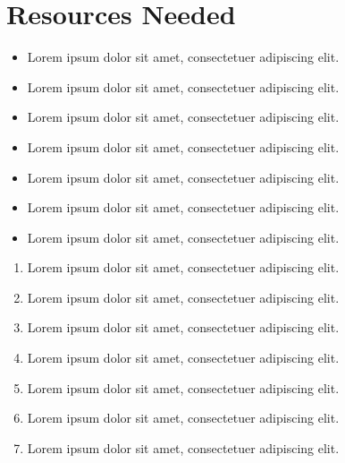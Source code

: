 \section{Resources Needed}

\begin{itemize}
    \item Lorem ipsum dolor sit amet, consectetuer adipiscing elit.
    \item Lorem ipsum dolor sit amet, consectetuer adipiscing elit.
    \item Lorem ipsum dolor sit amet, consectetuer adipiscing elit.
    \item Lorem ipsum dolor sit amet, consectetuer adipiscing elit.
    \item Lorem ipsum dolor sit amet, consectetuer adipiscing elit.
    \item Lorem ipsum dolor sit amet, consectetuer adipiscing elit.
    \item Lorem ipsum dolor sit amet, consectetuer adipiscing elit.
\end{itemize}

\vspace{1in}

\begin{enumerate}
    \item Lorem ipsum dolor sit amet, consectetuer adipiscing elit.
    \item Lorem ipsum dolor sit amet, consectetuer adipiscing elit.
    \item Lorem ipsum dolor sit amet, consectetuer adipiscing elit.
    \item Lorem ipsum dolor sit amet, consectetuer adipiscing elit.
    \item Lorem ipsum dolor sit amet, consectetuer adipiscing elit.
    \item Lorem ipsum dolor sit amet, consectetuer adipiscing elit.
    \item Lorem ipsum dolor sit amet, consectetuer adipiscing elit.
\end{enumerate}
